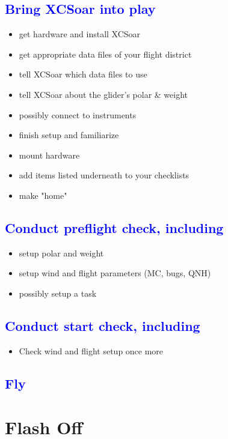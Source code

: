 \documentclass[english,a4paper,12pt,utf8]{scrreprt}
\begin{document}
\subsection{\textcolor{blue}{Bring XCSoar into play}}
\begin{itemize}
\item get hardware and install XCSoar
\item get appropriate data files of your flight district
\item tell XCSoar which data files to use
\item tell XCSoar about the glider's polar \& weight
\item possibly connect to instruments
\item finish setup and familiarize
\item mount hardware
\item add items listed underneath to your checklists
\item make "home"
\end{itemize}

\subsection{\textcolor{blue}{Conduct preflight check, including}}
\begin{itemize}
\item setup polar and weight
\item setup wind and flight parameters (MC, bugs, QNH)
\item possibly setup a task
\end{itemize}

\subsection{\textcolor{blue}{Conduct start check, including}}
\begin{itemize}
\item Check wind and flight setup once more
\end{itemize}

\subsection{\textcolor{blue}{Fly}}
\vspace{1em}

\section*{{\color[rgb]{.9,.85,0}Flash} Off}
\end{document}
